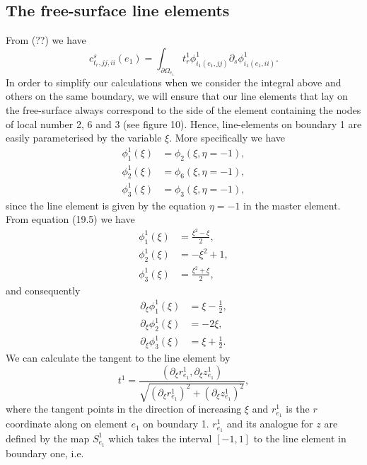 \documentclass{article}
\begin{document}
\subsection{The free-surface line elements}
From (??) we have
\begin{equation}
c_{t_r,jj,ii}^{s}(e_1) = \int_{\partial\Omega_{e_1}} t_r^1 \phi_{i_1(e_1,jj)}^1 \partial_s \phi_{i_1(e_1,ii)}^1. \tag{21.1}
\end{equation}
In order to simplify our calculations when we consider the integral above and others on the same boundary, we will ensure that our line elements that lay on the free-surface always correspond to the side of the element containing the nodes of local number 2, 6 and 3 (see figure 10). Hence, line-elements on boundary 1 are easily parameterised by the variable \(\xi\). More specifically we have
\begin{align}
\phi_1^1(\xi) &= \phi_2(\xi,\eta=-1), \tag{21.2}\\
\phi_2^1(\xi) &= \phi_6(\xi,\eta=-1), \tag{21.3}\\
\phi_3^1(\xi) &= \phi_3(\xi,\eta=-1), \tag{21.4}
\end{align}
since the line element is given by the equation \(\eta=-1\) in the master element.
From equation (19.5) we have
\begin{align}
\phi_1^1(\xi) &= \frac{\xi^2 - \xi}{2}, \tag{21.6}\\
\phi_2^1(\xi) &= -\xi^2 + 1, \tag{21.8}\\
\phi_3^1(\xi) &= \frac{\xi^2 + \xi}{2}, \tag{21.9}
\end{align}
and consequently
\begin{align}
\partial_\xi \phi_1^1(\xi) &= \xi - \frac12, \tag{21.10}\\
\partial_\xi \phi_2^1(\xi) &= -2\xi, \tag{21.11}\\
\partial_\xi \phi_3^1(\xi) &= \xi + \frac12. \tag{21.12}
\end{align}
We can calculate the tangent to the line element by
\begin{equation}
t^1 = \frac{ (\partial_\xi r_{e_1}^1, \partial_\xi z_{e_1}^1) }{ \sqrt{ (\partial_\xi r_{e_1}^1)^2 + (\partial_\xi z_{e_1}^1)^2 } }, \tag{21.13}
\end{equation}
where the tangent points in the direction of increasing \(\xi\) and \(r_{e_1}^1\) is the \(r\) coordinate along on element \(e_1\) on boundary 1. \(r_{e_1}^1\) and its analogue for \(z\) are defined by the map \(S_{e_1}^1\) which takes the interval \([-1,1]\) to the line element in boundary one, i.e.
\end{document}
